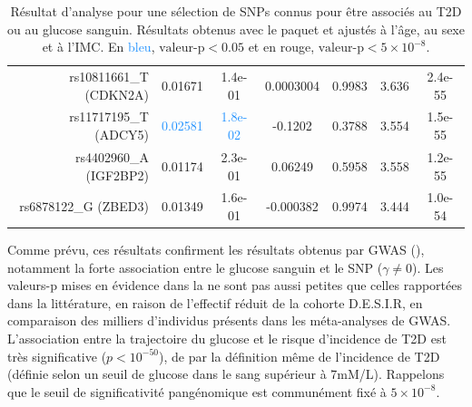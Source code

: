 \documentclass[11pt, a4paper]{article}
\begin{document}
\begin{table}[ht]
\begin{center}
\begin{tabular}{rcccccc}
                rs10811661\_T (CDKN2A) & 0.01671 & 1.4e-01 & 0.0003004 & 0.9983 & \textcolor{firebrick2}{3.636} & \textcolor{firebrick2}{2.4e-55} \\
                rs11717195\_T (ADCY5) & \textcolor{dodgerblue}{0.02581} & \textcolor{dodgerblue}{1.8e-02} & -0.1202 & 0.3788 & \textcolor{firebrick2}{3.554} & \textcolor{firebrick2}{1.5e-55} \\
                rs4402960\_A (IGF2BP2) & 0.01174 & 2.3e-01 & 0.06249 & 0.5958 & \textcolor{firebrick2}{3.558} & \textcolor{firebrick2}{1.2e-55} \\
                rs6878122\_G (ZBED3) & 0.01349 & 1.6e-01 & -0.000382 & 0.9974 & \textcolor{firebrick2}{3.444} & \textcolor{firebrick2}{1.0e-54} \\
            \hline
        \end{tabular}
    \end{center}
    \vspace{-15pt}
    \caption{Résultat d'analyse pour une sélection de SNPs connus pour être associés au T2D ou au glucose sanguin.
    Résultats obtenus avec le paquet  et ajustés à l'âge, au sexe et à l'IMC.
    {\small En \textcolor{dodgerblue}{bleu}, $\textrm{valeur-p}<0.05$ et en \textcolor{firebrick2}{rouge}, $\textrm{valeur-p}<5\times 10^{-8}$.}}
    \label{tab:desisrJM}
\end{table}\setlength{\tabcolsep}{10pt}
\par{Comme prévu, ces résultats confirment les résultats obtenus par GWAS (), notamment
la forte association entre le glucose sanguin et le SNP ($\gamma \neq 0$).
Les valeurs-p mises en évidence dans la  ne sont pas aussi petites que celles rapportées
dans la littérature, en raison de l'effectif réduit de la cohorte D.E.S.I.R, en comparaison des milliers d'individus
présents dans les méta-analyses de GWAS.
L'association entre la trajectoire du glucose et le risque d'incidence de T2D est très significative ($p<10^{-50}$), de par
la définition même de l'incidence de T2D (définie selon un seuil de glucose dans le sang supérieur à 7mM/L).
Rappelons que le seuil de significativité pangénomique est communément fixé à $5\times 10^{-8}$.}
\end{document}
